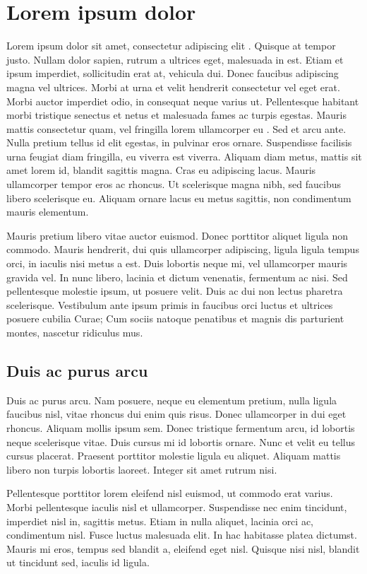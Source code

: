 \chapter{Lorem ipsum dolor}

Lorem ipsum dolor sit amet, consectetur adipiscing elit \cite{Ade:2014xna}. Quisque at tempor justo. Nullam dolor sapien, rutrum a ultrices eget, malesuada in est. Etiam et ipsum imperdiet, sollicitudin erat at, vehicula dui. Donec faucibus adipiscing magna vel ultrices. Morbi at urna et velit hendrerit consectetur vel eget erat. Morbi auctor imperdiet odio, in consequat neque varius ut. Pellentesque habitant morbi tristique senectus et netus et malesuada fames ac turpis egestas. Mauris mattis consectetur quam, vel fringilla lorem ullamcorper eu \cite{blackholes}. Sed et arcu ante. Nulla pretium tellus id elit egestas, in pulvinar eros ornare. Suspendisse facilisis urna feugiat diam fringilla, eu viverra est viverra. Aliquam diam metus, mattis sit amet lorem id, blandit sagittis magna. Cras eu adipiscing lacus. Mauris ullamcorper tempor eros ac rhoncus. Ut scelerisque magna nibh, sed faucibus libero scelerisque eu. Aliquam ornare lacus eu metus sagittis, non condimentum mauris elementum.

Mauris pretium libero vitae auctor euismod. Donec porttitor aliquet ligula non commodo. Mauris hendrerit, dui quis ullamcorper adipiscing, ligula ligula tempus orci, in iaculis nisi metus a est. Duis lobortis neque mi, vel ullamcorper mauris gravida vel. In nunc libero, lacinia et dictum venenatis, fermentum ac nisi. Sed pellentesque molestie ipsum, ut posuere velit. Duis ac dui non lectus pharetra scelerisque. Vestibulum ante ipsum primis in faucibus orci luctus et ultrices posuere cubilia Curae; Cum sociis natoque penatibus et magnis dis parturient montes, nascetur ridiculus mus.

\section{Duis ac purus arcu}
Duis ac purus arcu. Nam posuere, neque eu elementum pretium, nulla ligula faucibus nisl, vitae rhoncus dui enim quis risus. Donec ullamcorper in dui eget rhoncus. Aliquam mollis ipsum sem. Donec tristique fermentum arcu, id lobortis neque scelerisque vitae. Duis cursus mi id lobortis ornare. Nunc et velit eu tellus cursus placerat. Praesent porttitor molestie ligula eu aliquet. Aliquam mattis libero non turpis lobortis laoreet. Integer sit amet rutrum nisi.

Pellentesque porttitor lorem eleifend nisl euismod, ut commodo erat varius. Morbi pellentesque iaculis nisl et ullamcorper. Suspendisse nec enim tincidunt, imperdiet nisl in, sagittis metus. Etiam in nulla aliquet, lacinia orci ac, condimentum nisl. Fusce luctus malesuada elit. In hac habitasse platea dictumst. Mauris mi eros, tempus sed blandit a, eleifend eget nisl. Quisque nisi nisl, blandit ut tincidunt sed, iaculis id ligula.

